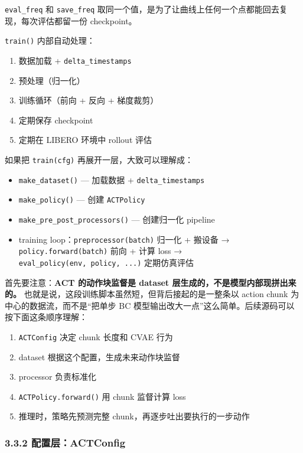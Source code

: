 \documentclass[
  chinese,
]{ctexart}
\providecommand{\tightlist}{%
  \setlength{\itemsep}{0pt}\setlength{\parskip}{0pt}}
\begin{document}
\texttt{eval\_freq} 和 \texttt{save\_freq}
取同一个值，是为了让曲线上任何一个点都能回去复现，每次评估都留一份
checkpoint。

\texttt{train()} 内部自动处理：

\begin{enumerate}
\def\labelenumi{\arabic{enumi}.}
\tightlist
\item
  数据加载 + \texttt{delta\_timestamps}
\item
  预处理（归一化）
\item
  训练循环（前向 + 反向 + 梯度裁剪）
\item
  定期保存 checkpoint
\item
  定期在 LIBERO 环境中 rollout 评估
\end{enumerate}

如果把 \texttt{train(cfg)} 再展开一层，大致可以理解成：

\begin{itemize}
\tightlist
\item
  \texttt{make\_dataset()} --- 加载数据 + \texttt{delta\_timestamps}
\item
  \texttt{make\_policy()} --- 创建 \texttt{ACTPolicy}
\item
  \texttt{make\_pre\_post\_processors()} --- 创建归一化 pipeline
\item
  training loop：\texttt{preprocessor(batch)} 归一化 + 搬设备 →
  \texttt{policy.forward(batch)} 前向 + 计算 loss →
  \texttt{eval\_policy(env,\ policy,\ ...)} 定期仿真评估
\end{itemize}

首先要注意：\textbf{ACT 的动作块监督是 dataset
层生成的，不是模型内部现拼出来的。}
也就是说，这段训练脚本虽然短，但背后接起的是一整条以 action chunk
为中心的数据流，而不是``把单步 BC
模型输出改大一点''这么简单。后续源码可以按下面这条顺序理解：

\begin{enumerate}
\def\labelenumi{\arabic{enumi}.}
\tightlist
\item
  \texttt{ACTConfig} 决定 chunk 长度和 CVAE 行为
\item
  dataset 根据这个配置，生成未来动作块监督
\item
  processor 负责标准化
\item
  \texttt{ACTPolicy.forward()} 用 chunk 监督计算 loss
\item
  推理时，策略先预测完整 chunk，再逐步吐出要执行的一步动作
\end{enumerate}

\subsubsection{3.3.2
配置层：ACTConfig}\label{ux914dux7f6eux5c42actconfig}
\end{document}
